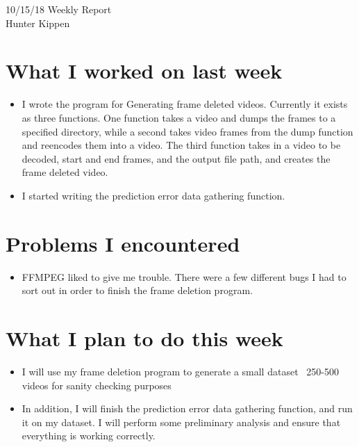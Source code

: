 \documentclass[12pt]{article}%
\def\bi{\begin{itemize}     %
\vspace{-0.5em}\setlength\itemsep{0em}}
\begin{document}
\begin{center}
{\LARGE 10/15/18 Weekly Report}\\
\vspace{0.5em}
{\Large Hunter Kippen}
\vspace{0.5em}
\end{center}


\section{What I worked on last week}
\bi
\item I wrote the program for Generating frame deleted videos. Currently it exists as three functions. One function takes a video and dumps the frames to a specified directory, while a second takes video frames from the dump function and reencodes them into a video. The third function takes in a video to be decoded, start and end frames, and the output file path, and creates the frame deleted video.
\item I started writing the prediction error data gathering function.
\end{itemize}


\section{Problems I encountered}
\bi
\item FFMPEG liked to give me trouble. There were a few different bugs I had to sort out in order to finish the frame deletion program.
\end{itemize}

\section{What I plan to do this week}
\bi
\item I will use my frame deletion program to generate a small dataset ~250-500 videos for sanity checking purposes
\item In addition, I will finish the prediction error data gathering function, and run it on my dataset. I will perform some preliminary analysis and ensure that everything is working correctly.
\end{itemize}



\begin{comment}
\pagebreak
%


%
\end{comment}
\end{document}

